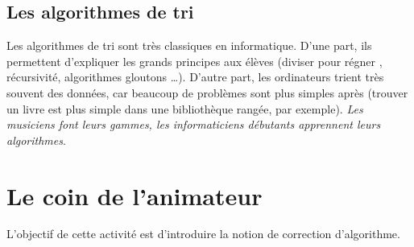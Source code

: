 \documentclass[a5paper,pagesize,DIV=14]{scrbook}
\begin{document}
\subsection*{Les algorithmes de tri}

Les algorithmes de tri sont très classiques en informatique. D'une part, ils
permettent d'expliquer les grands principes aux élèves (\og diviser pour régner
\fg, récursivité, algorithmes gloutons {\ldots}). D'autre part, les ordinateurs
trient très souvent des données, car beaucoup de problèmes sont plus simples
après (trouver un livre est plus simple dans une bibliothèque rangée, par
exemple). \textit{Les musiciens font leurs gammes, les informaticiens débutants
  apprennent leurs algorithmes}.



\section*{Le coin de l'animateur}

L'objectif de cette activité est d'introduire la notion de correction
d'algorithme.
\end{document}
